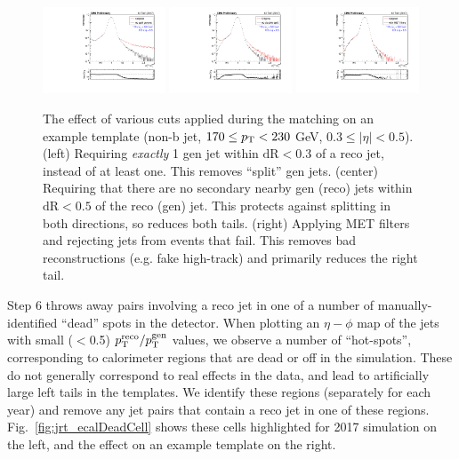 \begin{figure}[htbp]
  \begin{center}
    \includegraphics[width=0.325\textwidth]{figs/jetmet/compare_noSplitGen.pdf}
    \includegraphics[width=0.325\textwidth]{figs/jetmet/compare_noDoubleSplit.pdf}
    \includegraphics[width=0.325\textwidth]{figs/jetmet/compare_metFilters.pdf}
    \caption{The effect of various cuts applied during the matching on an example template (non-b jet, $170 \leq p_{\mathrm{T}} < 230$ GeV, $0.3 \leq |\eta| < 0.5$).
    (left) Requiring \emph{exactly} 1 gen jet within $\text{dR}<0.3$ of a reco jet, instead of at least one. This removes ``split'' gen jets.
    (center) Requiring that there are no secondary nearby gen (reco) jets within $\text{dR}<0.5$ of the reco (gen) jet. This protects
    against splitting in both directions, so reduces both tails.
    (right) Applying MET filters and rejecting jets from events that fail. This removes bad reconstructions (e.g. fake high-\pt track) and
    primarily reduces the right tail.
    }
    \label{fig:jrt_matching_effect}
  \end{center}
\end{figure}

Step 6 throws away pairs involving a reco jet in one of a number of manually-identified ``dead'' spots in the detector.
When plotting an $\eta-\phi$ map of the jets with small ($<$0.5) $p_{\mathrm{T}}^\text{reco}/p_{\mathrm{T}}^\text{gen}$ values,
we observe a number of ``hot-spots'', corresponding to calorimeter regions that are dead or off in the simulation.
These do not generally correspond to real effects in the data, and lead to artificially large left tails in the templates.
We identify these regions (separately for each year) and remove any jet pairs that contain a reco jet in one of these regions.
Fig.~\ref{fig:jrt_ecalDeadCell} shows these cells highlighted for 2017 simulation on the left, and
the effect on an example template on the right.

